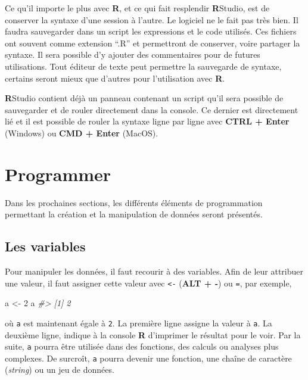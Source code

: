 \documentclass[
]{book}
\newenvironment{Shaded}{}{}
\newcommand{\CommentTok}[1]{\textit{#1}}
\newcommand{\DecValTok}[1]{#1}
\newcommand{\NormalTok}[1]{#1}
\newcommand{\OtherTok}[1]{#1}
\begin{document}
Ce qu'il importe le plus avec \textbf{R}, et ce qui fait resplendir \textbf{R}Studio, est de conserver la syntaxe d'une session à l'autre. Le logiciel ne le fait pas très bien. Il faudra sauvegarder dans un script les expressions et le code utilisés. Ces fichiers ont souvent comme extension ``.R'' et permettront de conserver, voire partager la syntaxe. Il sera possible d'y ajouter des commentaires pour de futures utilisations. Tout éditeur de texte peut permettre la sauvegarde de syntaxe, certains seront mieux que d'autres pour l'utilisation avec \textbf{R}.

\textbf{R}Studio contient déjà un panneau contenant un script qu'il sera possible de sauvegarder et de rouler directement dans la console. Ce dernier est directement lié et il est possible de rouler la syntaxe ligne par ligne avec \textbf{CTRL + Enter} (Windows) ou \textbf{CMD + Enter} (MacOS).

\hypertarget{programmer}{%
\chapter{Programmer}\label{programmer}}

Dans les prochaines sections, les différents éléments de programmation permettant la création et la manipulation de données seront présentés.

\hypertarget{les-variables}{%
\section{Les variables}\label{les-variables}}

Pour manipuler les données, il faut recourir à des variables. Afin de leur attribuer une valeur, il faut assigner cette valeur avec \texttt{\textless{}-} (\textbf{ALT + -}) ou \texttt{=}, par exemple,

\begin{Shaded}
\begin{Highlighting}[]
\NormalTok{a }\OtherTok{\textless{}{-}} \DecValTok{2}
\NormalTok{a}
\CommentTok{\#\textgreater{} [1] 2}
\end{Highlighting}
\end{Shaded}

où \texttt{a} est maintenant égale à \texttt{2}. La première ligne assigne la valeur à \texttt{a}. La deuxième ligne, indique à la console \textbf{R} d'imprimer le résultat pour le voir. Par la suite, \texttt{a} pourra être utilisée dans des fonctions, des calculs ou analyses plus complexes. De surcroît, \texttt{a} pourra devenir une fonction, une chaîne de caractère (\emph{string}) ou un jeu de données.
\end{document}
